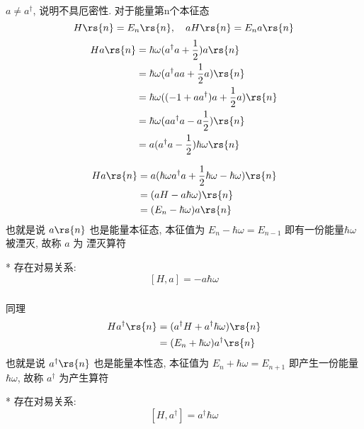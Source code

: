 \begin{frame} 
    \frametitle{}
$ a \not =  a^\dagger $, 说明不具厄密性. 对于能量第n个本征态 \\ 
\[ H  \rs{n} = E_n  \rs{n}, \quad  aH  \rs{n} =E_n a \rs{n}\]
\[
\begin{aligned}
      H a \rs{n} &=\hbar \omega (  a ^\dagger a + \frac{1}{2} )a \rs{n} \\ 
      &= \hbar \omega (   a ^\dagger a a  + \frac{1}{2} a ) \rs{n} \\ 
      &= \hbar \omega (   (-1+a a ^\dagger )a + \frac{1}{2} a ) \rs{n} \\ 
      &= \hbar \omega  (  a a ^\dagger a -  a \frac{1}{2} ) \rs{n} \\ 
      &=  a( a ^\dagger a -  \frac{1}{2} )\hbar \omega \rs{n} 
\end{aligned}
\]
\end{frame}


\begin{frame}
\[ 
\begin{aligned}
  H a \rs{n}  &=  a( \hbar \omega   a ^\dagger a +  \frac{1}{2}\hbar \omega  - \hbar \omega ) \rs{n} \\ 
      &=  (aH - a \hbar \omega ) \rs{n} \\ 
      &=  (E_n -  \hbar \omega ) a\rs{n} \\ 
\end{aligned}
\]
也就是说 $a \rs{n} $ 也是能量本征态, 本征值为 $E_n -  \hbar \omega = E_{n-1} $ 即有一份能量$ \hbar \omega $ 被湮灭, 故称 $a$ 为 湮灭算符 \\ {\vspace*{1.3em}} 

* 存在对易关系:
\[ [H, a ] = - a \hbar \omega \] 
\end{frame}

\begin{frame}
      \frametitle{}
    同理
      \[ 
        \begin{aligned}
          H a^\dagger \rs{n}  
              &=  (a^\dagger H + a^\dagger \hbar \omega ) \rs{n} \\ 
              &=  (E_n +  \hbar \omega ) a^\dagger \rs{n} 
        \end{aligned}
        \]
也就是说 $a^\dagger\rs{n} $ 也是能量本性态, 本征值为 $E_n + \hbar \omega = E_{n+1} $ 即产生一份能量$ \hbar \omega $,
故称 $a^\dagger$ 为产生算符 \\ {\vspace*{1.3em}} 

* 存在对易关系:
\[ [H, a^\dagger ] =  a^\dagger \hbar \omega \] 
\end{frame}


